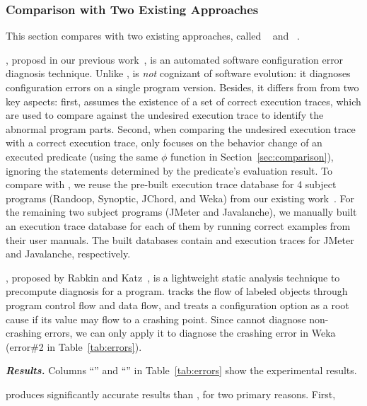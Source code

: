 \subsubsection{Comparison with Two Existing Approaches}
\label{sec:existing}

This section compares \ourtool with two existing approaches,
called \prevtool~\cite{Zhang:2013:ADS} and \conftool~\cite{Rabkin:2011:PPC}.

\prevtool, proposd in our previous work~\cite{Zhang:2013:ADS},
is an automated
software configuration error diagnosis technique. Unlike \ourtool,
\prevtool is \textit{not} cognizant of
software evolution: it diagnoses configuration errors on
a single program version.
Besides, it differs from \ourtool from two key aspects:
first, \prevtool assumes the existence of a set of correct execution
traces, which are used to compare against the undesired
execution trace to identify the abnormal program parts.
Second, when comparing the undesired execution trace with a
correct execution trace, \prevtool only focuses on the behavior
change of an executed predicate (using the same $\phi$
function in Section~\ref{sec:comparison}), ignoring the statements determined
by the predicate's evaluation result.  To compare \ourtool with \prevtool, 
we reuse the pre-built execution trace database
for 4 subject programs (Randoop, Synoptic, JChord, and Weka)
from our existing work~\cite{Zhang:2013:ADS}.
For the remaining two subject programs (JMeter and
Javalanche), we manually built an execution trace database
for each of them by running correct examples from their user manuals.
The built databases contain  and 
execution traces for JMeter and Javalanche, respectively.

\conftool, proposed by Rabkin and Katz~\cite{}, is a lightweight
static analysis technique to precompute diagnosis for a program.
\conftool tracks the flow of labeled objects through 
program control flow and data flow, and treats a configuration option
as a root cause if its value may flow to a crashing point.
Since \conftool cannot diagnose non-crashing errors, we
can only apply it to diagnose the crashing error in
Weka (error\#2 in Table~\ref{tab:errors}).


\vspace{1mm}
\noindent \textbf{\textit{Results.}}
Columns ``\prevtool'' and ``\conftool'' in Table~\ref{tab:errors} show
the experimental results.

\ourtool produces significantly accurate results than \prevtool,
for two primary reasons. First,

